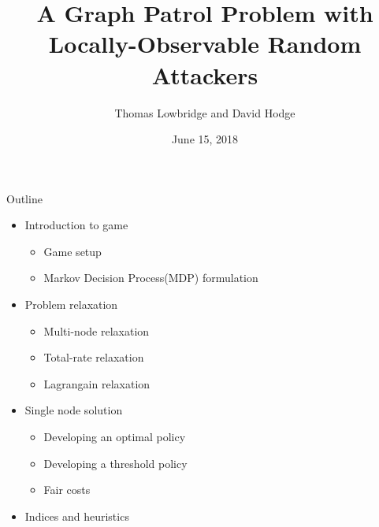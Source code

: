 \documentclass[10pt]{beamer}
\author{Thomas Lowbridge and David Hodge}
\title{A Graph Patrol Problem with Locally-Observable Random Attackers}
\institute{University Of Nottingham,UK}
\date{June 15, 2018}
\begin{document}
\hypertarget{Patrolling games}{}
\begin{frame}
\titlepage
\end{frame}


\begin{frame}{Outline}

\begin{itemize}
\item Introduction to game
\begin{itemize}
\item Game setup
\item Markov Decision Process(MDP) formulation
\end{itemize}
\item Problem relaxation
\begin{itemize}
\item Multi-node relaxation
\item Total-rate relaxation
\item Lagrangain relaxation
\end{itemize}
\item Single node solution
\begin{itemize}
\item Developing an optimal policy
\item Developing a threshold policy
\item Fair costs
\end{itemize}
\item Indices and heuristics
\end{itemize}
\end{frame}
\end{document}
